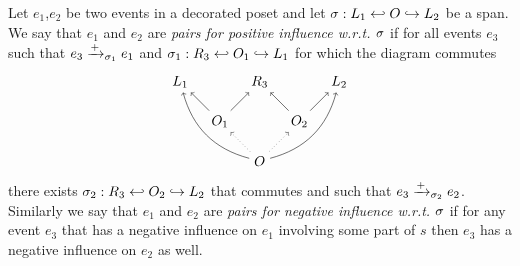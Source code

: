 \begin{definition}
  Let $e_1$,$e_2$ be two events in a decorated poset and let $\sigma:L_1\hookleftarrow O\hookrightarrow L_2$ be a span. We say that $e_1$ and $e_2$ are \emph{pairs for positive influence w.r.t. $\sigma$} if for all events $e_3$ such that $e_3\mathrel{\xrightarrow{+}}_{\sigma_1} e_1$ and $\sigma_1:R_3\hookleftarrow O_1\hookrightarrow L_1$ for which the diagram commutes
  \[
  \begin{tikzpicture} %
      \node (o) at (0,-1) {\(O\)};
      \node (r3) at (0,1) {\(R_3\)};
      \node (o1) at (-1,0) {\(O_1\)};
      \node (o2) at (1,0) {\(O_2\)};
      \node (r1) at (-2,1) {\(L_1\)};
      \node (r2) at (2,1) {\(L_2\)};
      \draw [dotted,->] (o) -- (o1);
      \draw [dotted,->] (o) -- (o2);
      \draw [->] (o1) -- (r3);
      \draw [->] (o2) -- (r3);
      \draw [->] (o1) -- (r1);
      \draw [->] (o2) -- (r2);
      \draw [->] (o) to [bend left] (r1);
      \draw [->] (o) to [bend right] (r2);
    \end{tikzpicture}
    \]
there exists $\sigma_2:R_3\hookleftarrow O_2\hookrightarrow L_2$ that commutes and such that $e_3\mathrel{\xrightarrow{+}}_{\sigma_2} e_2$.
Similarly we say that $e_1$ and $e_2$ are \emph{pairs for negative influence w.r.t. $\sigma$} if for any event $e_3$ that has a negative influence on $e_1$ involving some part of $s$ then $e_3$ has a negative influence on $e_2$ as well.
\end{definition}

